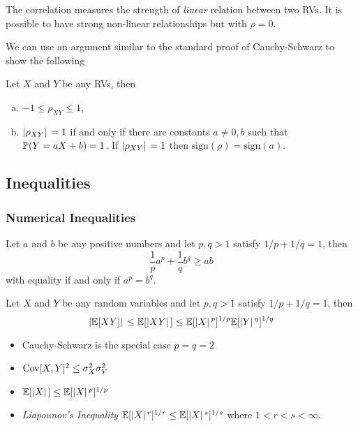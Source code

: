 \begin{remark}
    The correlation measures the strength of \emph{linear} relation between two RVs. It is possible to have strong non-linear relationships but with $\rho = 0$.
\end{remark}

We can use an argument similar to the standard proof of Cauchy-Schwarz to show the following
\begin{theorem}
    Let $X$ and $Y$ be any RVs, then
    \begin{enumerate}[a.]
        \item $-1 \leq \rho_{XY} \leq 1$,
        \item $\abs{\rho_{XY}} = 1$ if and only if there are constants $a \neq 0, b$ such that $\P{}(Y = aX + b) = 1$. If $\abs{\rho_{XY}} = 1$ then $\text{sign}(\rho) = \text{sign}(a)$.
    \end{enumerate}
\end{theorem}


\subsection{Inequalities}

\subsubsection{Numerical Inequalities}

\begin{theorem}
    Let $a$ and $b$ be any positive numbers and let $p, q > 1$ satisfy $1/p + 1/q = 1$, then
    \[
        \frac1p a^p + \frac1q b^q \geq ab
    \]
    with equality if and only if $a^p = b^q$.
\end{theorem}
    

\begin{theorem}
    Let $X$ and $Y$ be any random variables and let $p, q > 1$ satisfy $1/p + 1/q = 1$, then
    \[
        \abs{\E{}[XY]} \leq \E{}[\abs{XY}] \leq \E{}[\abs{X}^p]^{1/p} \E{}[\abs{Y}^q]^{1/q}
    \]
\end{theorem} 

\begin{corollary}\mbox{}
    \begin{itemize}
        \item Cauchy-Schwarz is the special case $p = q = 2$
        \item $\Cov[X, Y]^2 \leq \sigma_X^2 \sigma_Y^2$
        \item $\E{}[\abs{X}] \leq \E{}[\abs{X}^p]^{1/p}$
        \item \emph{Liapounov's Inequality} $\E{}[\abs{X}^r]^{1/r} \leq \E{}[\abs{X}^s]^{1/s}$ where $1 < r < s < \infty$.
    \end{itemize}
\end{corollary}


